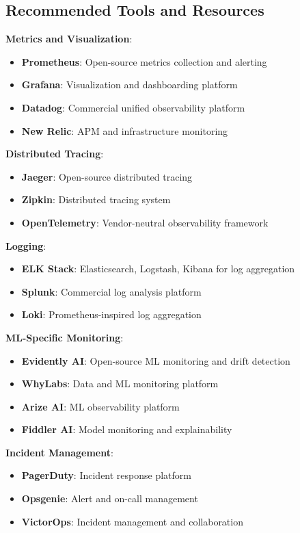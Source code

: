 \subsection{Recommended Tools and Resources}

\textbf{Metrics and Visualization}:
\begin{itemize}
    \item \textbf{Prometheus}: Open-source metrics collection and alerting
    \item \textbf{Grafana}: Visualization and dashboarding platform
    \item \textbf{Datadog}: Commercial unified observability platform
    \item \textbf{New Relic}: APM and infrastructure monitoring
\end{itemize}

\textbf{Distributed Tracing}:
\begin{itemize}
    \item \textbf{Jaeger}: Open-source distributed tracing
    \item \textbf{Zipkin}: Distributed tracing system
    \item \textbf{OpenTelemetry}: Vendor-neutral observability framework
\end{itemize}

\textbf{Logging}:
\begin{itemize}
    \item \textbf{ELK Stack}: Elasticsearch, Logstash, Kibana for log aggregation
    \item \textbf{Splunk}: Commercial log analysis platform
    \item \textbf{Loki}: Prometheus-inspired log aggregation
\end{itemize}

\textbf{ML-Specific Monitoring}:
\begin{itemize}
    \item \textbf{Evidently AI}: Open-source ML monitoring and drift detection
    \item \textbf{WhyLabs}: Data and ML monitoring platform
    \item \textbf{Arize AI}: ML observability platform
    \item \textbf{Fiddler AI}: Model monitoring and explainability
\end{itemize}

\textbf{Incident Management}:
\begin{itemize}
    \item \textbf{PagerDuty}: Incident response platform
    \item \textbf{Opsgenie}: Alert and on-call management
    \item \textbf{VictorOps}: Incident management and collaboration
\end{itemize}

